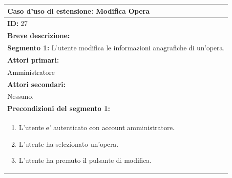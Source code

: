 \documentclass{article}
\begin{document}
                \begin{table}[H]
                    \begin{tabular}{|p{\linewidth}|}
                        \hline
                        \cellcolor{gray!100}
                        \color{white}
                        \centerline{\textbf{Caso d'uso di estensione:} Modifica Opera} \\
                        \hline
                        \textbf{ID:} 27 \\
                        \hline
                        \cellcolor{gray!20}
                        \textbf{Breve descrizione:} \\
                        \cellcolor{gray!20}
                        \textbf{Segmento 1:} L'utente modifica le informazioni anagrafiche di un'opera. \\
                        \hline
                        \textbf{Attori primari:} \\
                        \begin{minipage}{\linewidth}
                            Amministratore
                        \end{minipage}
                        \vspace{-10pt} \\ %
                        \hline
                        \textbf{Attori secondari:} \\
                        Nessuno. \\
                        \hline
                        \cellcolor{gray!20}
                        \textbf{Precondizioni del segmento 1:} \\
                        \cellcolor{gray!20}
                        \begin{minipage}{\linewidth}
                            \begin{enumerate}
                                \item L'utente e' autenticato con account amministratore.
                                \item L'utente ha selezionato un'opera.
                                \item L'utente ha premuto il pulsante di modifica.
                            \end{enumerate}
                        \end{minipage} \\

\end{tabular}
\end{table}
\end{document}
